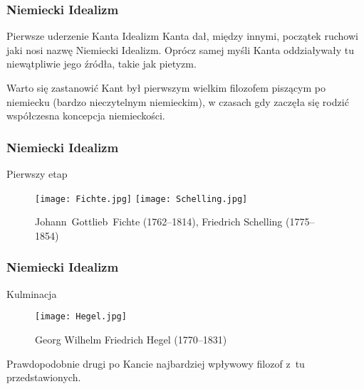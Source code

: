 \documentclass{beamer}  %
\begin{document}
\begin{frame}
  \frametitle{Niemiecki Idealizm}

  \begin{block}{Pierwsze uderzenie Kanta}
    Idealizm Kanta dał, między innymi, początek ruchowi jaki nosi
    nazwę Niemiecki Idealizm. Oprócz samej myśli Kanta oddziaływały tu
    niewątpliwie jego źródła, takie jak pietyzm.
  \end{block}
  \pause

  \begin{block}{Warto się zastanowić}
    Kant był pierwszym wielkim filozofem piszącym po niemiecku (bardzo
    nieczytelnym niemieckim), w czasach gdy zaczęła się rodzić
    współczesna koncepcja niemieckości.
  \end{block}

\end{frame}



\begin{frame}
  \frametitle{Niemiecki Idealizm}

  \begin{block}{Pierwszy etap}
    \begin{figure}
      \centering

      \texttt{[image: Fichte.jpg]}
      \texttt{[image: Schelling.jpg]}
      \caption{Johann~Gottlieb~Fichte (1762--1814), Friedrich
        Schelling (1775--1854)}
    \end{figure}
  \end{block}

\end{frame}



\begin{frame}
  \frametitle{Niemiecki Idealizm}

  \begin{block}{Kulminacja}
    \begin{figure}
      \centering

      \texttt{[image: Hegel.jpg]}

      \caption{Georg Wilhelm Friedrich Hegel (1770--1831)}
    \end{figure}
  \end{block}

  \begin{block}{}
    Prawdopodobnie drugi po Kancie najbardziej wpływowy filozof z~tu
    przedstawionych.
  \end{block}

\end{frame}
\end{document}
